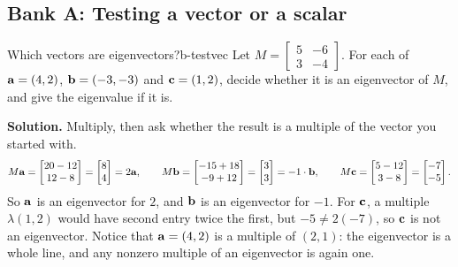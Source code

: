 \documentclass[11pt]{article}
\begin{document}
\subsection*{Bank A: Testing a vector or a scalar}
\begin{exmp}{Which vectors are eigenvectors?}{b-testvec}
Let $M=\begin{bmatrix}5&-6\\3&-4\end{bmatrix}$. For each of $\mathbf{a}=(4,2)$, $\mathbf{b}=(-3,-3)$ and $\mathbf{c}=(1,2)$, decide whether it is an eigenvector of $M$, and give the eigenvalue if it is.

\textbf{Solution.} Multiply, then ask whether the result is a multiple of the vector you started with.
\[
M\mathbf{a}=\begin{bmatrix}20-12\\12-8\end{bmatrix}=\begin{bmatrix}8\\4\end{bmatrix}=2\mathbf{a},\qquad
M\mathbf{b}=\begin{bmatrix}-15+18\\-9+12\end{bmatrix}=\begin{bmatrix}3\\3\end{bmatrix}=-1\cdot\mathbf{b},\qquad
M\mathbf{c}=\begin{bmatrix}5-12\\3-8\end{bmatrix}=\begin{bmatrix}-7\\-5\end{bmatrix}.
\]
So $\mathbf{a}$ is an eigenvector for $2$, and $\mathbf{b}$ is an eigenvector for $-1$. For $\mathbf{c}$, a multiple $\lambda(1,2)$ would have second entry twice the first, but $-5\neq2(-7)$, so $\mathbf{c}$ is not an eigenvector. Notice that $\mathbf{a}=(4,2)$ is a multiple of $(2,1)$: the eigenvector is a whole line, and any nonzero multiple of an eigenvector is again one.
\end{exmp}
\end{document}
